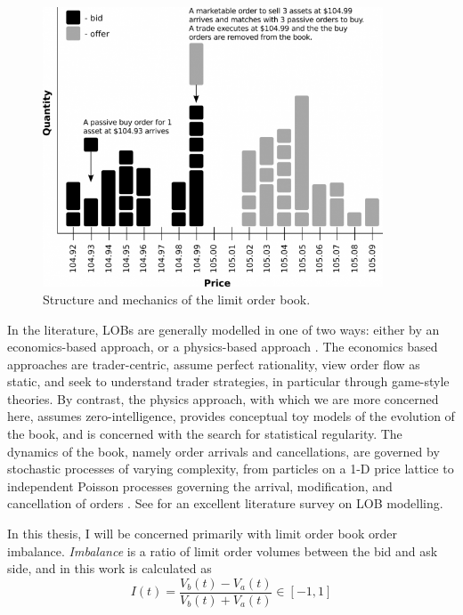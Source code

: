 \begin{figure}
%  
  \includegraphics[width=0.9\textwidth]{Figs/LOBAshBooth.png}
\caption{Structure and mechanics of the limit order book.}
\label{fig:LOB}
\end{figure}

In the literature, LOBs are generally modelled in one of two ways: either by an economics-based approach, or a physics-based approach \cite{Summary2013}. The economics based approaches are trader-centric, assume perfect rationality, view order flow as static, and seek to understand trader strategies, in particular through game-style theories. By contrast, the physics approach, with which we are more concerned here, assumes zero-intelligence, provides conceptual toy models of the evolution of the book, and is concerned with the search for statistical regularity. The dynamics of the book, namely order arrivals and cancellations, are governed by stochastic processes of varying complexity, from particles on a 1-D price lattice \cite{Bak97} to independent Poisson processes governing the arrival, modification, and cancellation of orders \cite{Cont10}. See \cite{Summary2013} for an excellent literature survey on LOB modelling.

In this thesis, I will be concerned primarily with limit order book order imbalance. \emph{Imbalance} is a ratio of limit order volumes between the bid and ask side, and in this work is calculated as 
\begin{equation}\label{eq:LOBImbalance}
I(t) = \dfrac{V_b(t) - V_a(t)}{V_b(t) + V_a(t)} \in [-1,1]
\end{equation}

